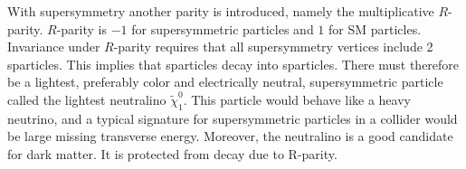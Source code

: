 \documentclass[11pt]{article}
\begin{document}
\begin{flushleft}
With supersymmetry another parity is introduced, namely the multiplicative $R$-parity. $R$-parity is $-1$ for supersymmetric particles and $1$ for SM particles. Invariance under $R$-parity requires that all supersymmetry vertices include 2 sparticles. This implies that sparticles decay into sparticles. There must therefore be a lightest, preferably color and electrically neutral, supersymmetric particle called the lightest neutralino $\tilde{\chi}^0_1$. This particle would behave like a heavy neutrino, and a typical signature for supersymmetric particles in a collider would be large missing transverse energy. Moreover, the neutralino is a good candidate for dark matter. It is protected from decay due to R-parity.
\end{flushleft}
\end{document}
